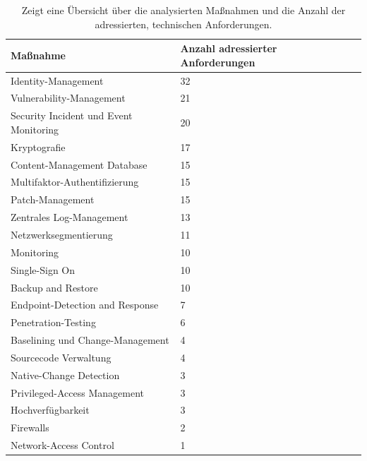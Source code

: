 \begin{table}[H]
    \centering
    \caption{Zeigt eine Übersicht über die analysierten Maßnahmen und die Anzahl der adressierten, technischen Anforderungen.} 
    \begin{tabular}{llll}
        Maßnahme & Anzahl adressierter Anforderungen\\
        \hline\hline
        Identity-Management & 32\\
        Vulnerability-Management & 21\\
        Security Incident und Event Monitoring & 20\\
        Kryptografie & 17\\
        Content-Management Database & 15\\
        Multifaktor-Authentifizierung & 15\\
        Patch-Management & 15\\
        Zentrales Log-Management & 13\\
        Netzwerksegmentierung & 11\\
        Monitoring & 10\\
        Single-Sign On & 10\\
        Backup and Restore & 10\\
        Endpoint-Detection and Response & 7\\
        Penetration-Testing & 6\\
        Baselining und Change-Management & 4\\
        Sourcecode Verwaltung & 4\\
        Native-Change Detection & 3\\
        Privileged-Access Management & 3\\
        Hochverfügbarkeit & 3\\
        Firewalls & 2\\
        Network-Access Control & 1
    \end{tabular}
    \label{table:maßnahmen_uebersicht_anzahl}
\end{table}